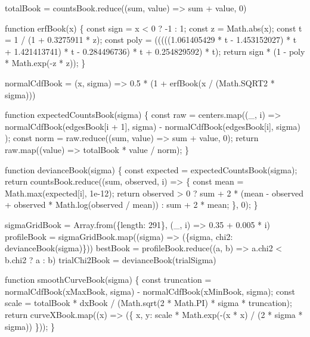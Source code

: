 \documentclass[
  russian,
  letterpaper,
]{scrbook}
\newenvironment{Shaded}{\begin{snugshade}}{\end{snugshade}}
\newcommand{\NormalTok}[1]{\textcolor[rgb]{0.00,0.23,0.31}{#1}}
\begin{document}
\begin{Shaded}
\begin{Highlighting}[]
\NormalTok{totalBook = countsBook.reduce((sum, value) =\textgreater{} sum + value, 0)}

\NormalTok{function erfBook(x) \{}
\NormalTok{  const sign = x \textless{} 0 ? {-}1 : 1;}
\NormalTok{  const z = Math.abs(x);}
\NormalTok{  const t = 1 / (1 + 0.3275911 * z);}
\NormalTok{  const poly = (((((1.061405429 * t {-} 1.453152027) * t + 1.421413741) * t {-} 0.284496736) * t + 0.254829592) * t);}
\NormalTok{  return sign * (1 {-} poly * Math.exp({-}z * z));}
\NormalTok{\}}

\NormalTok{normalCdfBook = (x, sigma) =\textgreater{} 0.5 * (1 + erfBook(x / (Math.SQRT2 * sigma)))}

\NormalTok{function expectedCountsBook(sigma) \{}
\NormalTok{  const raw = centers.map((\_, i) =\textgreater{}}
\NormalTok{    normalCdfBook(edgesBook[i + 1], sigma) {-} normalCdfBook(edgesBook[i], sigma)}
\NormalTok{  );}
\NormalTok{  const norm = raw.reduce((sum, value) =\textgreater{} sum + value, 0);}
\NormalTok{  return raw.map((value) =\textgreater{} totalBook * value / norm);}
\NormalTok{\}}

\NormalTok{function devianceBook(sigma) \{}
\NormalTok{  const expected = expectedCountsBook(sigma);}
\NormalTok{  return countsBook.reduce((sum, observed, i) =\textgreater{} \{}
\NormalTok{    const mean = Math.max(expected[i], 1e{-}12);}
\NormalTok{    return observed \textgreater{} 0}
\NormalTok{      ? sum + 2 * (mean {-} observed + observed * Math.log(observed / mean))}
\NormalTok{      : sum + 2 * mean;}
\NormalTok{  \}, 0);}
\NormalTok{\}}

\NormalTok{sigmaGridBook = Array.from(\{length: 291\}, (\_, i) =\textgreater{} 0.35 + 0.005 * i)}
\NormalTok{profileBook = sigmaGridBook.map((sigma) =\textgreater{} (\{sigma, chi2: devianceBook(sigma)\}))}
\NormalTok{bestBook = profileBook.reduce((a, b) =\textgreater{} a.chi2 \textless{} b.chi2 ? a : b)}
\NormalTok{trialChi2Book = devianceBook(trialSigma)}

\NormalTok{function smoothCurveBook(sigma) \{}
\NormalTok{  const truncation = normalCdfBook(xMaxBook, sigma) {-} normalCdfBook(xMinBook, sigma);}
\NormalTok{  const scale = totalBook * dxBook / (Math.sqrt(2 * Math.PI) * sigma * truncation);}
\NormalTok{  return curveXBook.map((x) =\textgreater{} (\{}
\NormalTok{    x,}
\NormalTok{    y: scale * Math.exp({-}(x * x) / (2 * sigma * sigma))}
\NormalTok{  \}));}
\NormalTok{\}}


\end{Highlighting}
\end{Shaded}
\end{document}
